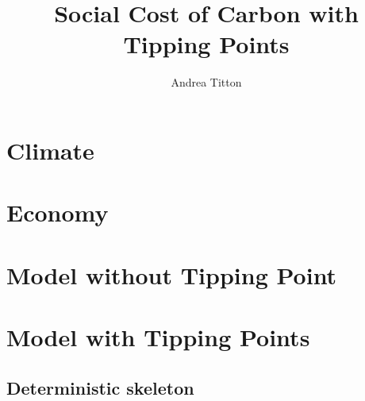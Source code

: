 \documentclass[american, abstract=on]{scrartcl}
\author{Andrea Titton}
\title{Social Cost of Carbon with Tipping Points}
\begin{document}
\maketitle
\section{Climate}



\section{Economy}



\section{Model without Tipping Point}



\section{Model with Tipping Points}

\subsection{Deterministic skeleton}


\nocite{*}
\newpage
\printbibliography
\end{document}
